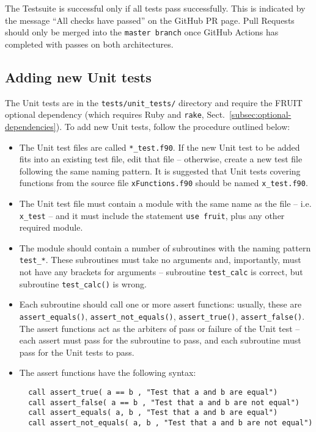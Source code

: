 The Testsuite is successful only if all tests pass successfully. This is
indicated by the message ``All checks have passed'' on the GitHub PR page.
Pull Requests should only be merged into the \texttt{master\ branch}
once GitHub Actions has completed with passes on both architectures.

\subsection{Adding new Unit tests} \label{subsec:adding-new-unit-tests}

The Unit tests are in the \texttt{tests/unit\_tests/} directory and
require the FRUIT optional dependency (which requires Ruby and
\texttt{rake}, Sect.~\ref{subsec:optional-dependencies}). To add new
Unit tests, follow the procedure outlined below:

\begin{itemize}
\item The Unit test files are called \texttt{*\_test.f90}. If the new
  Unit test to be added fits into an existing test file, edit that
  file -- otherwise, create a new test file following the same naming
  pattern. It is suggested that Unit tests covering functions from the
  source file \texttt{xFunctions.f90} should be named
  \texttt{x\_test.f90}.
\item The Unit test file must contain a module with the same name as
  the file -- i.e. \texttt{x\_test} -- and it must include the
  statement \verb|use fruit|, plus any other required module.
\item The module should contain a number of subroutines with the
  naming pattern \texttt{test\_*}. These subroutines must take no
  arguments and, importantly, must not have any brackets for arguments
  -- subroutine \texttt{test\_calc} is correct, but subroutine
  \texttt{test\_calc()} is wrong.
\item Each subroutine should call one or more assert functions:
  usually, these are \texttt{assert\_equals()}, \texttt{assert\_not\_equals()},
  \texttt{assert\_true()}, \texttt{assert\_false()}. The assert functions
  act as the arbiters of pass or failure of the Unit test -- each
  assert must pass for the subroutine to pass, and each subroutine
  must pass for the Unit tests to pass.
\item The assert functions have the following syntax:
  \begin{verbatim}
  call assert_true( a == b , "Test that a and b are equal")
  call assert_false( a == b , "Test that a and b are not equal")
  call assert_equals( a, b , "Test that a and b are equal")
  call assert_not_equals( a, b , "Test that a and b are not equal")
  \end{verbatim}
\end{itemize}

